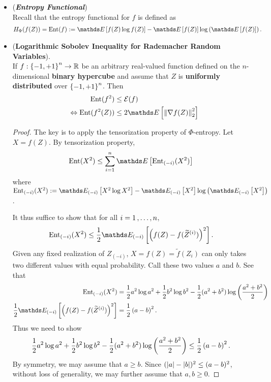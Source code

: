 \documentclass[11pt]{article}
\begin{document}
\begin{itemize}
\item \begin{remark} (\emph{\textbf{Entropy Functional}})\\
Recall that the entropy functional for $f$ is defined as
\begin{align*}
H_{\Phi}(f(Z)) = \text{Ent}(f)&:=  \E{}{f(Z)\log f(Z)} - \E{}{f(Z)}\log\paren{\E{}{f(Z)}}. 
\end{align*}
\end{remark}

\item \begin{proposition} (\textbf{Logarithmic Sobolev Inequality for Rademacher Random Variables}). \citep{boucheron2013concentration}\\
If $f: \left\{-1, +1\right\}^n \to {\mathbb R}$ be an arbitrary real-valued function  defined on the $n$-dimensional \textbf{binary hypercube} and assume that $Z$ is \textbf{uniformly} \textbf{distributed} over $\left\{-1, +1\right\}^n$. Then
\begin{align}
\text{Ent}(f^2) &\le \cE(f) \label{ineqn: log_sobolev_inequality_binary_cube} \\
\Leftrightarrow \text{Ent}(f^2(Z)) &\le 2\E{}{\norm{\nabla f(Z)}{2}^2}  \label{ineqn: log_sobolev_inequality_binary_cube_2}
\end{align}
\end{proposition}
\begin{proof}
The key is to apply the tensorization property of $\Phi$-entropy. Let $X = f(Z)$. By tensorization property,
\begin{align*}
\text{Ent}(X^2) &\le \sum_{i=1}^{n}\E{}{\text{Ent}_{(-i)}(X^2) } 
\end{align*} where $\text{Ent}_{(-i)}(X^2) := \E{(-i)}{X^2\log X^2} - \E{(-i)}{X^2}\log\paren{\E{(-i)}{X^2}}$.

It thus suffice to show that for all $i=1\,{,}\ldots{,}\, n$,
\begin{align*}
\text{Ent}_{(-i)}(X^2) &\le \frac{1}{2}\E{(-i)}{\paren{f(Z) - f(\widetilde{Z}^{(i)}) }^2}.
\end{align*} Given any fixed realization of $Z_{(-i)}$, $X = f(Z) = \widetilde{f}(Z_i)$ can only takes two different values with equal probability. Call these two values $a$ and $b$. See that  
\begin{align*}
\text{Ent}_{(-i)}(X^2) &= \frac{1}{2}a^2\log a^2 + \frac{1}{2}b^2\log b^2 - \frac{1}{2}(a^2 + b^2)\log\paren{\frac{a^2 + b^2}{2}} \\
\frac{1}{2}\E{(-i)}{\paren{f(Z) - f(\widetilde{Z}^{(i)}) }^2} &= \frac{1}{2}\paren{a - b}^2.
\end{align*} Thus we need to show
\begin{align*}
\frac{1}{2}a^2\log a^2 + \frac{1}{2}b^2\log b^2 - \frac{1}{2}(a^2 + b^2)\log\left(\frac{a^2 + b^2}{2}\right) &\le \frac{1}{2}\left(a - b\right)^2. 
\end{align*} By symmetry, we may assume that $a \ge b$. Since $(\left\lvert a \right\rvert - \left\lvert b \right\rvert)^2 \le (a-b)^2$, without loss of generality, we may further assume that $a, b \ge 0$.


\end{proof}
\end{itemize}
\end{document}
